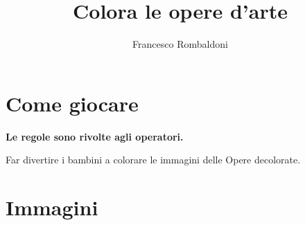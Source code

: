 \documentclass[hidelinks,12pt,a4paper]{article}
\begin{document}
	
	\title{\textbf{\\Colora le opere d'arte}}
	\author{Francesco Rombaldoni}
	\date{}
	
	\maketitle
	\newpage
	
	\tableofcontents
	\newpage
	
	\section{Come giocare}
	\begin{center}
		\textbf{Le regole sono rivolte agli operatori.}
	\end{center}
	
	Far divertire i bambini a colorare le immagini delle Opere decolorate.
	
	\section{Immagini}
	\newpage
	
\end{document}
